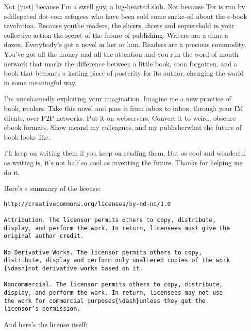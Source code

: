 Not (just) because I’m a swell guy, a big-hearted slob. Not because
Tor is run by addlepated dot-com refugees who have been sold some
snake-oil about the e-book revolution. Because you{\dash}the readers, the
slicers, dicers and copiers{\dash}hold in your collective action the
secret of the future of publishing. Writers are a dime a dozen.
Everybody’s got a novel in her or him. Readers are a precious
commodity. You’ve got all the money and all the attention and you
run the word-of-mouth network that marks the difference between a
little book, soon forgotten, and a book that becomes a lasting
piece of posterity for its author, changing the world in some
meaningful way.

I’m unashamedly exploiting your imagination. Imagine me a new
practice of book, readers. Take this novel and pass it from inbox
to inbox, through your IM clients, over P2P networks. Put it on
webservers. Convert it to weird, obscure ebook formats. Show me{\dash}and
my colleagues, and my publisher{\dash}what the future of book looks
like.

I’ll keep on writing them if you keep on reading them. But as cool
and wonderful as writing is, it’s not half so cool as inventing the
future. Thanks for helping me do it.

Here’s a summary of the license:

\begin{Verbatim}[fontsize=\footnotesize]
http://creativecommons.org/licenses/by-nd-nc/1.0

Attribution. The licensor permits others to copy, distribute,
display, and perform the work. In return, licensees must give the
original author credit.

No Derivative Works. The licensor permits others to copy,
distribute, display and perform only unaltered copies of the work
{\dash}not derivative works based on it.

Noncommercial. The licensor permits others to copy, distribute,
display, and perform the work. In return, licensees may not use
the work for commercial purposes{\dash}unless they get the
licensor’s permission.
\end{Verbatim}
And here’s the license itself:

